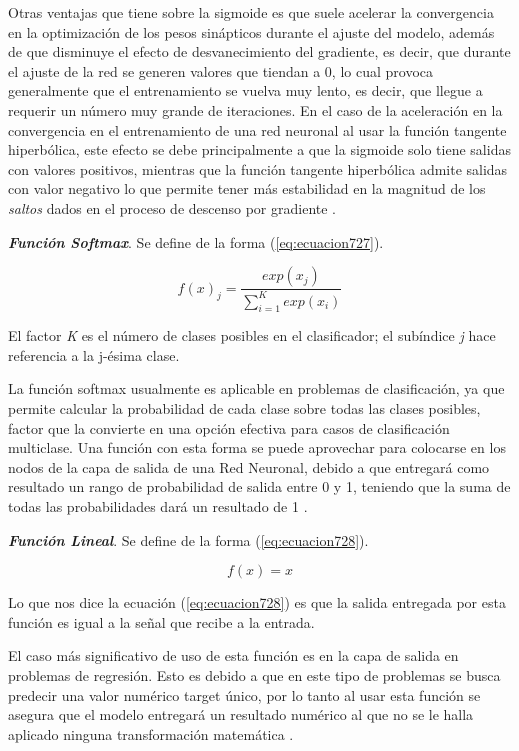 {Otras ventajas que tiene sobre la sigmoide es que suele acelerar la convergencia en la optimización de los pesos sinápticos durante el ajuste del modelo, además de que disminuye 
el efecto de desvanecimiento del gradiente, es decir, que durante el ajuste de la red se generen valores que tiendan a 0, lo cual provoca generalmente que el entrenamiento se vuelva muy lento, es decir, que llegue a 
requerir un número muy grande de iteraciones. En el caso de la aceleración en la convergencia en el entrenamiento de una red neuronal al usar la función tangente hiperbólica, este efecto se debe principalmente a que la sigmoide 
solo tiene salidas con valores positivos, mientras que la función tangente hiperbólica admite salidas con valor negativo lo que permite tener más estabilidad en la magnitud de los \textit{saltos} dados en el proceso de descenso 
por gradiente \cite{RNAconceptosBasicos}.

\textbf{\textit{Función Softmax}}. Se define de la forma (\ref{eq:ecuacion727}).

\begin{equation}
	f(x)_j=\frac{exp(x_j)}{\sum_{i=1}^{K} {exp(x_i)}}
	\label{eq:ecuacion727}
\end{equation}

El factor \textit{K} es el número de clases posibles en el clasificador; el subíndice \textit{j} hace referencia a la j-ésima clase.

La función softmax usualmente es aplicable en problemas de clasificación, ya que permite calcular la probabilidad de cada clase sobre todas las clases posibles, factor que la convierte en una opción efectiva para casos de 
clasificación multiclase. Una función con esta forma se puede aprovechar para colocarse en los nodos de la capa de salida de una Red Neuronal, debido a que entregará como resultado un rango de probabilidad de salida entre 
0 y 1, teniendo que la suma de todas las probabilidades dará un resultado de 1 \cite{tanhArgentina}.

\textbf{\textit{Función Lineal}}. Se define de la forma (\ref{eq:ecuacion728}).

\begin{equation}
	f(x)=x
	\label{eq:ecuacion728}
\end{equation}

Lo que nos dice la ecuación (\ref{eq:ecuacion728}) es que la salida entregada por esta función es igual a la señal que recibe a la entrada.

El caso más significativo de uso de esta función es en la capa de salida en problemas de regresión. Esto es debido a que en este tipo de problemas se busca predecir una valor numérico target único, por lo tanto al usar esta 
función se asegura que el modelo entregará un resultado numérico al que no se le halla aplicado ninguna transformación matemática \cite{RNAconceptosBasicos}.

}
